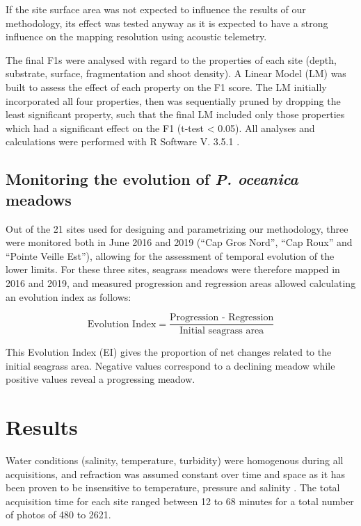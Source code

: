 If the site surface area was not expected to influence the results of our methodology, its effect was tested anyway as it is expected to have a strong influence on the mapping resolution using acoustic telemetry.

The final F1s were analysed with regard to the properties of each site (depth, substrate, surface, fragmentation and shoot density). A Linear Model (LM) was built to assess the effect of each property on the F1 score. The LM initially incorporated all four properties, then was sequentially pruned by dropping the least significant property, such that the final LM included only those properties which had a significant effect on the F1 (t-test < 0.05). All analyses and calculations were performed with R Software V. 3.5.1 \citep{r_core_team_r:_2018}.

\subsection{Monitoring the evolution of \textit{P. oceanica} meadows}
Out of the 21 sites used for designing and parametrizing our methodology, three were monitored both in June 2016 and 2019 (“Cap Gros Nord”, “Cap Roux” and “Pointe Veille Est”), allowing for the assessment of temporal evolution of the lower limits. For these three sites, seagrass meadows were therefore mapped in 2016 and 2019, and measured progression and regression areas allowed calculating an evolution index as follows:

\begin{equation}
\text{Evolution Index}=\frac{\text{Progression - Regression}}{\text{Initial seagrass area}}
\end{equation}

This Evolution Index (EI) gives the proportion of net changes related to the initial seagrass area. Negative values correspond to a declining meadow while positive values reveal a progressing meadow.


\section{Results}\label{chapitre3_3}
Water conditions (salinity, temperature, turbidity) were homogenous during all acquisitions, and refraction was assumed constant over time and space as it has been proven to be insensitive to temperature, pressure and salinity \citep{moore_underwater_1976}. The total acquisition time for each site ranged between 12 to 68 minutes for a total number of photos of 480 to 2621. 

